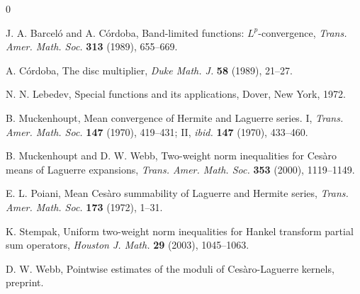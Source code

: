 \documentclass[leqno,a4paper]{amsart}
\begin{document}
\begin{thebibliography}{0}

 J. A. Barcel\'o and A. C\'ordoba,
Band-limited functions: $L^p$-convergence,
\textit{Trans. Amer. Math. Soc.}
\textbf{313} (1989), 655--669.

 A. C\'ordoba, The disc multiplier,
\textit{Duke Math. J.} \textbf{58} (1989), 21--27.

 N. N. Lebedev,
Special functions and its applications,
Dover, New York, 1972.

 B. Muckenhoupt,
Mean convergence of Hermite and Laguerre series. I,
\textit{Trans. Amer. Math. Soc.}
\textbf{147} (1970), 419--431;
{II}, \textit{ibid.} \textbf{147} (1970), 433--460.

 B. Muckenhoupt and D. W. Webb,
Two-weight norm inequalities for Ces\`aro means of Laguerre expansions,
\textit{Trans. Amer. Math. Soc.}
\textbf{353} (2000), 1119--1149.

 E. L. Poiani,
Mean Ces\`aro summability of Laguerre and Hermite series,
\textit{Trans. Amer. Math. Soc.}
\textbf{173} (1972), 1--31.

 K. Stempak,
Uniform two-weight norm inequalities for Hankel transform partial
sum operators,
\textit{Houston J. Math.}
\textbf{29} (2003), 1045--1063.

 D. W. Webb,
Pointwise estimates of the moduli of Ces\`aro-Laguerre kernels,
{preprint}.

\end{thebibliography}
\end{document}
